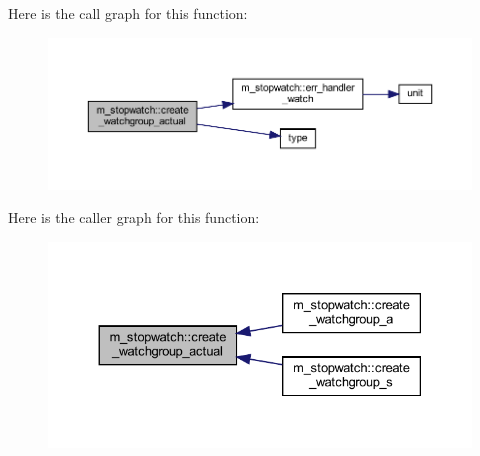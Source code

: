 Here is the call graph for this function\+:
\nopagebreak
\begin{figure}[H]
\begin{center}
\leavevmode
\includegraphics[width=350pt]{namespacem__stopwatch_abd31bbf07f8a1571c0ed46f9afc61667_cgraph}
\end{center}
\end{figure}
Here is the caller graph for this function\+:
\nopagebreak
\begin{figure}[H]
\begin{center}
\leavevmode
\includegraphics[width=330pt]{namespacem__stopwatch_abd31bbf07f8a1571c0ed46f9afc61667_icgraph}
\end{center}
\end{figure}
\mbox{\label{namespacem__stopwatch_a703105817c40afaacbda440167c539f4}} 
